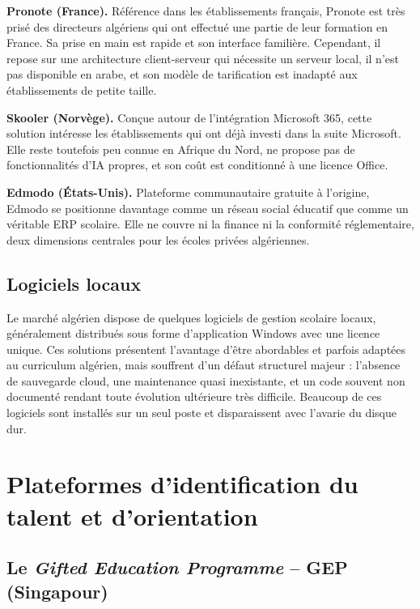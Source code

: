 \documentclass[12pt,a4paper,oneside]{report}
\begin{document}
\textbf{Pronote (France).} Référence dans les établissements français, Pronote est très prisé des directeurs algériens qui ont effectué une partie de leur formation en France. Sa prise en main est rapide et son interface familière. Cependant, il repose sur une architecture client-serveur qui nécessite un serveur local, il n'est pas disponible en arabe, et son modèle de tarification est inadapté aux établissements de petite taille.

\textbf{Skooler (Norvège).} Conçue autour de l'intégration Microsoft 365, cette solution intéresse les établissements qui ont déjà investi dans la suite Microsoft. Elle reste toutefois peu connue en Afrique du Nord, ne propose pas de fonctionnalités d'IA propres, et son coût est conditionné à une licence Office.

\textbf{Edmodo (États-Unis).} Plateforme communautaire gratuite à l'origine, Edmodo se positionne davantage comme un réseau social éducatif que comme un véritable \ac{ERP} scolaire. Elle ne couvre ni la finance ni la conformité réglementaire, deux dimensions centrales pour les écoles privées algériennes.

\subsection{Logiciels locaux}

Le marché algérien dispose de quelques logiciels de gestion scolaire locaux, généralement distribués sous forme d'application Windows avec une licence unique. Ces solutions présentent l'avantage d'être abordables et parfois adaptées au curriculum algérien, mais souffrent d'un défaut structurel majeur : l'absence de sauvegarde cloud, une maintenance quasi inexistante, et un code souvent non documenté rendant toute évolution ultérieure très difficile. Beaucoup de ces logiciels sont installés sur un seul poste et disparaissent avec l'avarie du disque dur.

\section{Plateformes d'identification du talent et d'orientation}

\subsection{Le \textit{Gifted Education Programme} -- GEP (Singapour)}
\end{document}
